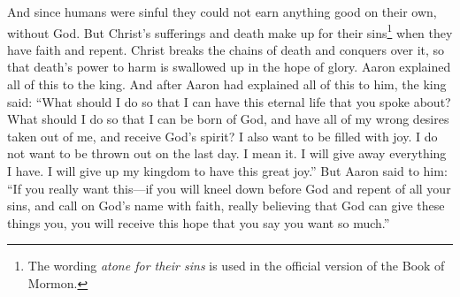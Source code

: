 \bverse \iffalse And since man had fallen he could not merit anything of himself; but the sufferings and death of Christ atone for their sins, through faith and repentance, and so forth; and that he breaketh the bands of death, that the grave shall have no victory, and that the sting of death should be swallowed up in the hopes of glory; and Aaron did expound all these things unto the king. \fi
And since humans were sinful they could not earn anything good on their own, without God. But Christ's sufferings and death make up for their sins\footnote{The wording \textit{atone for their sins} is used in the official version of the Book of Mormon.} when they have faith and repent. Christ breaks the chains of death and conquers over it, so that death's power to harm is swallowed up in the hope of glory. Aaron explained all of this to the king.
\bverse \iffalse And it came to pass that after Aaron had expounded these things unto him, the king said: What shall I do that I may have this eternal life of which thou hast spoken? Yea, what shall I do that I may be born of God, having this wicked spirit rooted out of my breast, and receive his Spirit, that I may be filled with joy, that I may not be cast off at the last day? Behold, said he, I will give up all that I possess, yea, I will forsake my kingdom, that I may receive this great joy. \fi
And after Aaron had explained all of this to him, the king said: ``What should I do so that I can have this eternal life that you spoke about? What should I do so that I can be born of God, and have all of my wrong desires taken out of me, and receive God's spirit? I also want to be filled with joy. I do not want to be thrown out on the last day. I mean it. I will give away everything I have. I will give up my kingdom to have this great joy.''
\bverse \iffalse But Aaron said unto him: If thou desirest this thing, if thou wilt bow down before God, yea, if thou wilt repent of all thy sins, and will bow down before God, and call on his name in faith, believing that ye shall receive, then shalt thou receive the hope which thou desirest. \fi
But Aaron said to him: ``If you really want this---if you will kneel down before God and repent of all your sins, and call on God's name with faith, really believing that God can give these things you, you will receive this hope that you say you want so much.''
\bverse \iffalse And it came to pass that when Aaron had said these words, the king did bow down before the Lord, upon his knees; yea, even he did prostrate himself upon the earth, and cried mightily, saying: \fi
